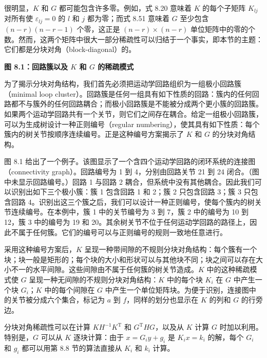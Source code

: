 \documentclass[10pt,a4paper]{book}
\theoremstyle{thmstyle} %
\theoremstyle{defstyle} %
\theoremstyle{prostyle} %
\begin{document}
很明显，$K$ 和 $G$ 都可能包含许多零。例如，式 8.20 意味着 $K$ 的每个子矩阵 $K_{lj}$ 对所有使 $\varepsilon_{lj} = 0$ 的 $l$ 和 $j$ 都为零；而式 8.51 意味着 $G$ 至少包含 $(n-r)(n-r-1)$ 个零，这正是 $(n-r) \times (n-r)$ 单位矩阵中的零的个数。然而，这两个矩阵中很大一部分稀疏性可以归结于一个事实，即本节的主题：它们都是分块对角（block-diagonal）的。



\noindent\textbf{图 8.1：回路簇以及 $K$ 和 $G$ 的稀疏模式}





为了揭示分块对角结构，我们首先必须把运动学回路组织为一组极小回路簇（minimal loop cluster）。回路簇是任何一组具有如下性质的回路：簇内的任何回路都不与簇外的任何回路耦合；而极小回路簇是不能被分成两个更小簇的回路簇。如果两个运动学回路共有一个关节，则它们之间存在耦合。给定一组极小回路簇，可以为生成树设计一种正则编号（regular numbering），使其具有如下性质：每个簇内的树关节按顺序连续编号。正是这种编号方案揭示了 $K$ 和 $G$ 的分块对角结构。



图 8.1 给出了一个例子。该图显示了一个含四个运动学回路的闭环系统的连接图（connectivity graph）。回路编号为 1 到 4，分别由回路关节 21 到 24 闭合。（图中未显示回路编号。）回路 1 与回路 2 耦合，但系统中没有其他耦合。因此我们可以识别出如下三个极小簇：簇 1 包含回路 1 和 2；簇 2 只包含回路 3；簇 3 只包含回路 4。识别出这三个簇之后，我们可以设计一种正则编号，使每个簇内的树关节连续编号。在本例中，簇 1 中的关节编号为 3 到 7，簇 2 中的编号为 10 到 12，簇 3 中的编号为 19 和 20。其余树关节不位于任何运动学回路的路径上，因此不属于任何簇。它们的编号可以与正则编号的规则一致地任意进行。



采用这种编号方案后，$K$ 呈现一种带间隙的不规则分块对角结构：每个簇有一个块；块一般是矩形的；每个块的大小和形状可以与其他块不同；块之间可以存在大小不一的水平间隙。这些间隙由不属于任何簇的树关节造成。$K$ 中的这种稀疏模式使 $G$ 呈现一种无间隙的不规则分块对角结构：$K$ 中的每个块 $K_i$ 在 $G$ 中产生一个块 $G_i$；$K$ 中的每个间隙在 $G$ 中产生一个单位矩阵块。为便于识别，连接图中的关节被分成六个集合，标记为 $a$ 到 $f$，同样的划分也显示在 $K$ 的列和 $G$ 的行旁边。



分块对角稀疏性可以在计算 $KH^{-1}K^{\mathrm{T}}$ 和 $G^{\mathrm{T}}HG$，以及从 $K$ 计算 $G$ 时加以利用。特别是，$G$ 可以从 $K$ 逐块计算：由于 $x = G_{i}y + g_{i}$ 是 $K_{i}x = k_{i}$ 的解，每个 $G_{i}$ 和 $g_{i}$ 都可以用第 8.8 节的算法直接从 $K_{i}$ 和 $k_{i}$ 计算。
\end{document}
